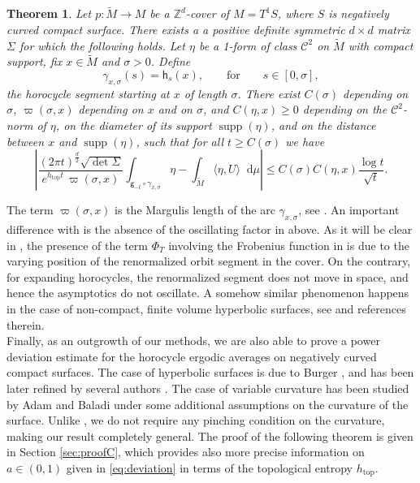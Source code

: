 \documentclass[11pt,letterpaper]{amsart}
\newcommand \Z {{ \mathbb Z}}
\newcommand \tM {{\widetilde M}}
\newcommand{\horo}{\mathsf{h}}
\newcommand{\geo}{\mathsf{g}}
\newcommand*{\diff}{\mathop{}\!\mathrm{d}}
\DeclareMathOperator{\topp}{top}
\DeclareMathOperator{\supp}{supp}
\newtheorem{bigthm}{Theorem}
\theoremstyle{definition}
\begin{document}
\begin{bigthm}\label{thm:main_result_2}
	Let $p \colon \tM \to M$ be a $\Z^d$-cover of $M = T^1S$, where $S$ is negatively curved compact surface. There exists a a positive definite symmetric $d \times d$ matrix $\Sigma$
for which the following holds.
Let  $\eta$ be a 1-form of class $\mathscr{C}^2$ on $\tM$ with compact support, fix $x \in \tM$ and $\sigma >0$. Define 
\[
\gamma_{x,\sigma}(s) = \horo_s(x), \qquad \text{for} \qquad s \in [0,\sigma],
\]
the horocycle segment starting at $x$ of length $\sigma$. There exist $C(\sigma)$ depending on $\sigma$, $\varpi(\sigma,x)$ depending on $x$ and on $\sigma$, and $C(\eta,x)\geq 0$ depending on the $\mathscr{C}^2$-norm of $\eta$, on the diameter of its support $\supp(\eta)$, and on the distance between $x$ and $\supp(\eta)$, such that for all $t \geq C(\sigma)$ we have
\[
\left\lvert \frac{(2\pi  t)^{\frac{d}{2}}\sqrt{\det \Sigma}}{e^{h_{\topp} t} \, \varpi(\sigma,x)} \int_{\geo_{-t} \circ \gamma_{x, \sigma}} \eta - \int_{\tM} \langle \eta, U\rangle \diff \mu \right\rvert \leq C(\sigma) C(\eta,x) \frac{\log t}{ \sqrt{t}}.
\]
\end{bigthm}
The term $\varpi(\sigma,x)$ is the Margulis length of the arc $\gamma_{x,\sigma}$, see .
An important difference with  is the absence of the oscillating factor in  above. As it will be clear in , the presence of the term $\Phi_T$ involving the Frobenius function in  is due to the varying position of the renormalized orbit segment in the cover. On the contrary, for expanding horocycles, the renormalized segment does not move in space, and hence the asymptotics do not oscillate. A somehow similar phenomenon happens in the case of non-compact, finite volume hyperbolic surfaces, see \cite{FlFo} and references therein. \\

Finally, as an outgrowth of our methods, we are also able to prove a power deviation estimate for the horocycle ergodic averages on negatively curved compact surfaces. The case of hyperbolic surfaces is due to Burger \cite{Bur}, and has been later refined by several authors \cite{FlFo, BuFo, Str, Rav}. The case of variable curvature has been studied by Adam and Baladi \cite{AdBa} under some additional assumptions on the curvature of the surface. 
Unlike \cite[Corollary 4.9]{AdBa}, we do not require any pinching condition on the curvature, making our result completely general. The proof of the following theorem is given in Section \ref{sec:proofC}, which provides also more precise information on $a\in (0,1)$ given in \eqref{eq:deviation} in terms of the topological entropy $h_{\topp}$.
\end{document}
